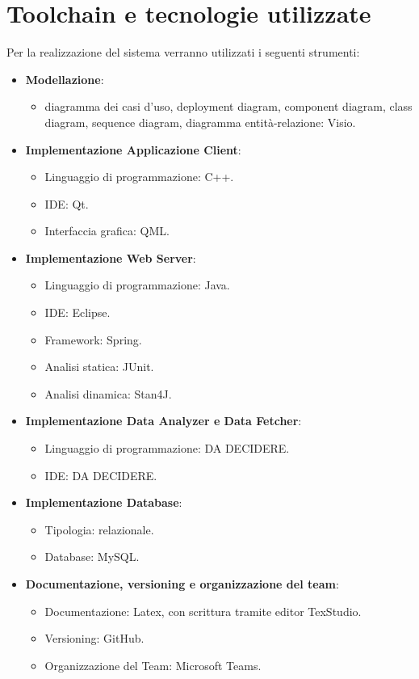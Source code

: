 \chapter{Toolchain e tecnologie utilizzate}
Per la realizzazione del sistema verranno utilizzati i seguenti strumenti:
\begin{itemize}
	\item \textbf{Modellazione}:
	\begin{itemize}
		\item diagramma dei casi d'uso, deployment diagram, component diagram, class
		diagram, sequence diagram, diagramma entità-relazione: Visio.
	\end{itemize}
	\item \textbf{Implementazione Applicazione Client}:
	\begin{itemize}
		\item Linguaggio di programmazione: C++.
		\item IDE: Qt.
		\item Interfaccia grafica: QML.
	\end{itemize}
	\item \textbf{Implementazione Web Server}:
	\begin{itemize}
		\item Linguaggio di programmazione: Java.
		\item IDE: Eclipse.
		\item Framework: Spring.
		\item Analisi statica: JUnit.
		\item Analisi dinamica: Stan4J.
	\end{itemize}
	\item \textbf{Implementazione Data Analyzer e Data Fetcher}:
	\begin{itemize}
		\item Linguaggio di programmazione: DA DECIDERE.
		\item IDE: DA DECIDERE.
	\end{itemize}
	\item \textbf{Implementazione Database}:
	\begin{itemize}
		\item Tipologia: relazionale.
		\item Database: MySQL.
	\end{itemize}
	\item \textbf{Documentazione, versioning e organizzazione del team}:
	\begin{itemize}
		\item Documentazione: Latex, con scrittura tramite editor TexStudio.
		\item Versioning: GitHub.
		\item Organizzazione del Team: Microsoft Teams.
	\end{itemize}
\end{itemize}